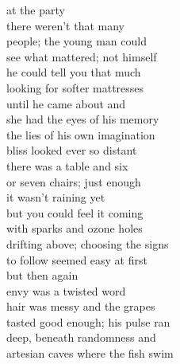 at the party\\
there weren't that many\\
people; the young man could\\
see what mattered; not himself\\
he could tell you that much\\
looking for softer mattresses\\
until he came about and\\
she had the eyes of his memory\\
the lies of his own imagination\\
bliss looked ever so distant\\

there was a table and six\\
or seven chairs; just enough\\
it wasn't raining yet\\
but you could feel it coming\\
with sparks and ozone holes\\
drifting above; choosing the signs\\
to follow seemed easy at first\\

but then again\\
envy was a twisted word\\
hair was messy and the grapes\\
tasted good enough; his pulse ran\\
deep, beneath randomness and\\
artesian caves where the fish swim\\
